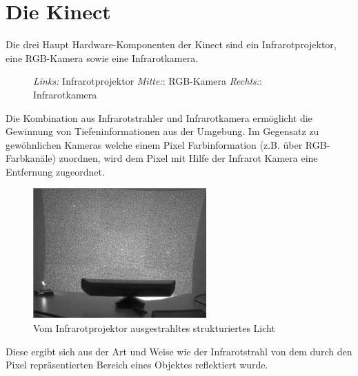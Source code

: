 \chapter{Die Kinect}
Die drei Haupt Hardware-Komponenten der Kinect sind ein Infrarotprojektor, eine RGB-Kamera sowie eine Infrarotkamera.
\begin{figure}[!ht]
  \centering
   \caption{\emph {Links:} Infrarotprojektor \emph {Mitte:}: RGB-Kamera  \emph {Rechts:}: Infrarotkamera }
\end{figure}
Die Kombination aus Infrarotstrahler und Infrarotkamera ermöglicht die Gewinnung von Tiefeninformationen aus der Umgebung. Im Gegensatz zu gewöhnlichen Kameras welche einem Pixel Farbinformation (z.B.  über RGB-Farbkanäle) zuordnen, wird dem Pixel mit Hilfe der Infrarot Kamera eine Entfernung zugeordnet.
\begin{figure}
  \vspace{-20pt}
  \begin{center}
        \includegraphics[height=5cm]{Res/Kinect_9Points.png}
  \end{center}
  \vspace{-20pt}
  \caption{Vom Infrarotprojektor ausgestrahltes strukturiertes Licht }
  \vspace{-10pt}
\end{figure}
Diese ergibt sich aus der Art und Weise wie der Infrarotstrahl von dem durch den Pixel repräsentierten Bereich eines Objektes reflektiert wurde.
